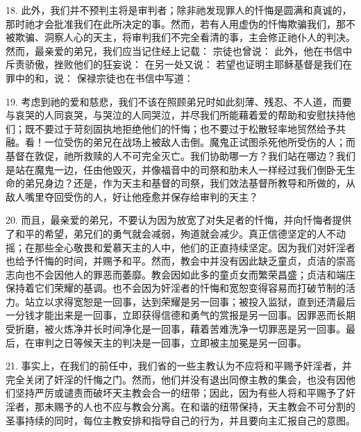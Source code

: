 18. 此外，我们并不预判主将是审判者；除非祂发现罪人的忏悔是圆满和真诚的，那时祂才会批准我们在此所决定的事。然而，若有人用虚伪的忏悔欺骗我们，那不被欺骗、洞察人心的天主，将审判我们不完全看清的事，主会修正祂仆人的判决。然而，最亲爱的弟兄，我们应当记住经上记载： 宗徒也曾说：  此外，他在书信中斥责骄傲，挫败他们的狂妄说： 在另一处又说： 若望也证明主耶稣基督是我们在罪中的和，说： 保禄宗徒也在书信中写道： \par

19. 考虑到祂的爱和慈悲，我们不该在照顾弟兄时如此刻薄、残忍、不人道，而要与哀哭的人同哀哭，与哭泣的人同哭泣，并尽我们所能藉着爱的帮助和安慰扶持他们；既不要过于苛刻固执地拒绝他们的忏悔；也不要过于松散轻率地贸然给予共融。看！一位受伤的弟兄在战场上被敌人击倒。魔鬼正试图杀死他所受伤的人；而基督在敦促，祂所救赎的人不可完全灭亡。我们协助哪一方？我们站在哪边？我们是站在魔鬼一边，任由他毁灭，并像福音中的司祭和肋未人一样经过我们倒卧无生命的弟兄身边？还是，作为天主和基督的司祭，我们效法基督所教导和所做的，从敌人嘴里夺回受伤的人，好让他痊愈并保存给审判的天主？\par

20. 而且，最亲爱的弟兄，不要认为因为放宽了对失足者的忏悔，并向忏悔者提供了和平的希望，弟兄们的勇气就会减弱，殉道就会减少。真正信德坚定的人不动摇；在那些全心敬畏和爱慕天主的人中，他们的正直持续坚定。因为我们对奸淫者也给予忏悔的时间，并赐予和平。然而，教会中并没有因此缺乏童贞，贞洁的崇高志向也不会因他人的罪恶而萎靡。教会因如此多的童贞女而繁荣昌盛；贞洁和端庄保持着它们荣耀的基调。也不会因为奸淫者的忏悔和宽恕变得容易而打破节制的活力。站立以求得宽恕是一回事，达到荣耀是另一回事；被投入监狱，直到还清最后一分钱才能出来是一回事，立即获得信德和勇气的赏报是另一回事。因罪恶而长期受折磨，被火炼净并长时间净化是一回事，藉着苦难洗净一切罪恶是另一回事。最后，在审判之日等候天主的判决是一回事，立即被主加冕是另一回事。\par

21. 事实上，在我们的前任中，我们省的一些主教认为不应将和平赐予奸淫者，并完全关闭了奸淫的忏悔之门。然而，他们并没有退出同僚主教的集会，也没有因他们坚持严厉或谴责而破坏天主教会合一的纽带；因此，因为有些人将和平赐予了奸淫者，那未赐予的人也不应与教会分离。在和谐的纽带保持，天主教会不可分割的圣事持续的同时，每位主教安排和指导自己的行为，并且要向主汇报自己的意图。\par

